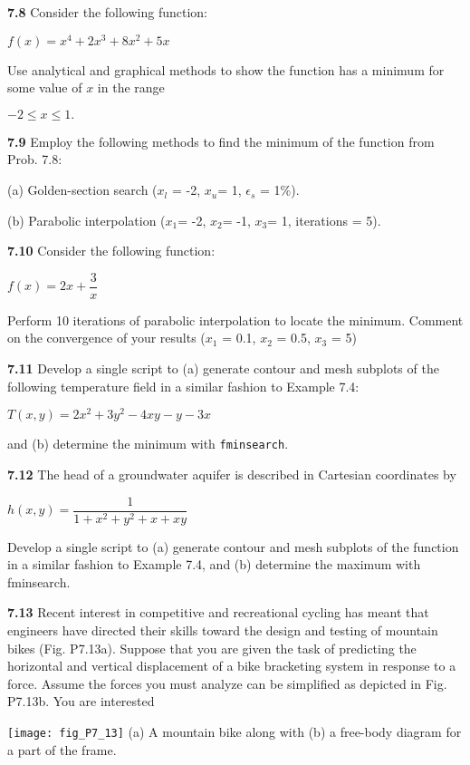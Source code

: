 \documentclass[../main.tex]{subfiles}
\begin{document}
\begin{multicols}{2}
	\noindent\textbf{7.8} Consider the following function:

	\noindent $f(x) = x^4 + 2x^3 + 8x^2 + 5x$

	\noindent Use analytical and graphical methods to show the function
	has a minimum for some value of $x$ in the range

	$-2 \le x \le 1.$

	\noindent\textbf{7.9} Employ the following methods to find the minimum of
	the function from Prob. 7.8:

	\noindent (a) Golden-section search ($x_l$ = -2, $x_u$= 1, $\epsilon_s$ = 1\%).

	\noindent (b) Parabolic interpolation ($x_1$= -2, $x_2$= -1, $x_3$= 1, iterations = 5).

	\noindent\textbf{7.10} Consider the following function:

	\noindent$f(x)=2x+\dfrac{3}{x}$

	\noindent Perform 10 iterations of parabolic interpolation to locate
	the minimum. Comment on the convergence of your results
	($x_1$ = 0.1, $x_2$ = 0.5, $x_3$ = 5)

	\noindent\textbf{7.11} Develop a single script to (a) generate contour and
	mesh subplots of the following temperature field in a similar
	fashion to Example 7.4:

	\noindent $T(x, y) = 2x^2 + 3y^2 - 4xy - y - 3x$

	\noindent and (b) determine the minimum with \texttt{fminsearch}.

	\noindent\textbf{7.12} The head of a groundwater aquifer is described in
	Cartesian coordinates by

	\noindent $h(x,y) = \dfrac{1}{1+x^2 + y^2 + x +xy}$

	\noindent Develop a single script to (a) generate contour and mesh
	subplots of the function in a similar fashion to Example 7.4,
	and (b) determine the maximum with fminsearch.

	\noindent\textbf{7.13} Recent interest in competitive and recreational cycling
	has meant that engineers have directed their skills toward the
	design and testing of mountain bikes (Fig. P7.13a). Suppose
	that you are given the task of predicting the horizontal
	and vertical displacement of a bike bracketing system in
	response to a force. Assume the forces you must analyze can
	be simplified as depicted in Fig. P7.13b. You are interested

	\begin{center}
	\texttt{[image: fig\_P7\_13]}
	\textsf{(a) A mountain bike along with (b) a free-body diagram
	for a part of the frame.}
	\end{center}


\end{multicols}
\end{document}
